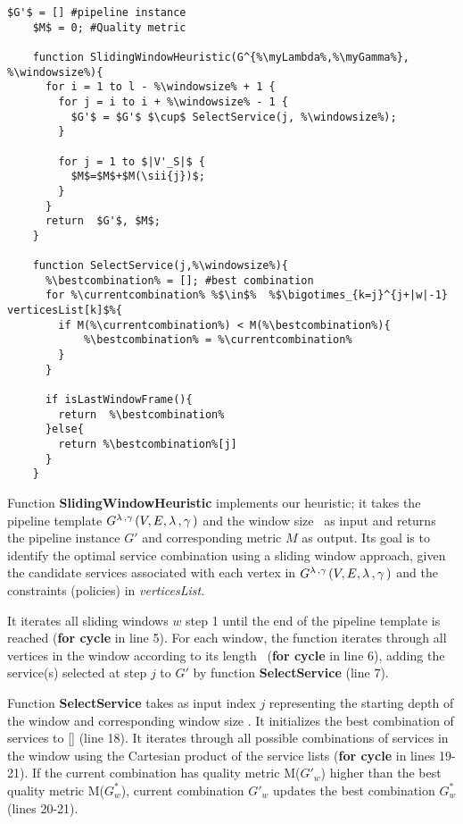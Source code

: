 \begin{minipage}{\linewidth}
  \begin{lstlisting}[escapechar=\%,mathescape, caption={Sliding Window Heuristic with Selection of First Service from Optimal Combination},label={lst:slidingwindowfirstservice}]
    $G'$ = [] #pipeline instance
    $M$ = 0; #Quality metric

    function SlidingWindowHeuristic(G^{%\myLambda%,%\myGamma%}, %\windowsize%){
      for i = 1 to l - %\windowsize% + 1 {
        for j = i to i + %\windowsize% - 1 {
          $G'$ = $G'$ $\cup$ SelectService(j, %\windowsize%);
        }

        for j = 1 to $|V'_S|$ {
          $M$=$M$+$M(\sii{j})$;
        }
      }
      return  $G'$, $M$;
    }

    function SelectService(j,%\windowsize%){
      %\bestcombination% = []; #best combination
      for %\currentcombination% %$\in$%  %$\bigotimes_{k=j}^{j+|w|-1} verticesList[k]$%{
        if M(%\currentcombination%) < M(%\bestcombination%){
            %\bestcombination% = %\currentcombination%
        }
      }

      if isLastWindowFrame(){
        return  %\bestcombination%
      }else{
        return %\bestcombination%[j]
      }
    }
    \end{lstlisting}

\end{minipage}

Function \textbf{SlidingWindowHeuristic} implements our heuristic; it takes the pipeline template $G^{\lambda\,,\gamma\,}(V,E,\lambda\,,\gamma\,)$ and the window size \windowsize\ as input and returns the pipeline instance $G'$ and corresponding metric $M$ as output. Its goal is to identify the optimal service combination using a sliding window approach, given the candidate services associated with each vertex in $G^{\lambda\,,\gamma\,}(V,E,\lambda\,,\gamma\,)$ and the constraints (policies) in \emph{verticesList}.

It iterates all sliding windows $w$ step 1 until the end of the pipeline template is reached (\textbf{for cycle} in line 5). For each window, the function iterates through all vertices in the window according to its length \windowsize\ (\textbf{for cycle} in line 6), adding the service(s) selected at step $j$ to $G'$ by function \textbf{SelectService} (line 7).

Function \textbf{SelectService} takes as input index $j$ representing the starting depth of the window and corresponding window size \windowsize. It initializes the best combination of services to [] (line 18). It iterates through all possible combinations of services in the window using the Cartesian product of the service lists (\textbf{for cycle} in lines 19-21). If the current combination has quality metric M($G'_w$) higher than the best quality metric M($G^*_w$), current combination $G'_w$ updates the best combination $G^*_w$ (lines 20-21).

